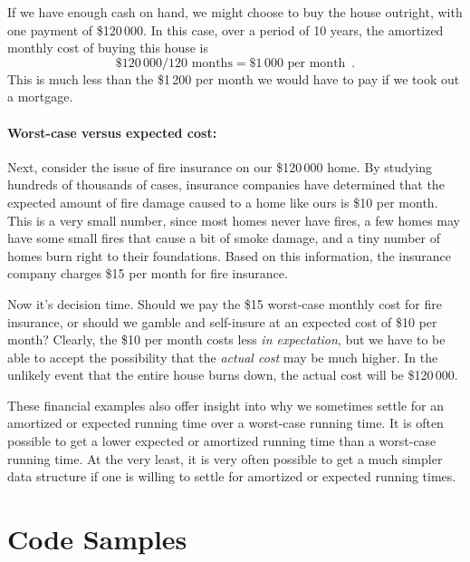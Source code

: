 If we have enough cash on hand, we might choose to buy the house outright,
with one payment of \$120\,000.  In this case, over a period of 10 years,
the amortized monthly cost of buying this house is
\[
   \$120\,000 / 120\text{ months} = \$1\,000\text{ per month} \enspace .
\]
This is much less than the \$1\,200 per month we would have to pay if
we took out a mortgage.

\paragraph{Worst-case versus expected cost:}
%
Next, consider the issue of fire insurance on our \$120\,000 home.
By studying hundreds of thousands of cases, insurance companies have
determined that the expected amount of fire damage caused to a home
like ours is \$10 per month.  This is a very small number, since most
homes never have fires, a few homes may have some small fires that
cause a bit of smoke damage, and a tiny number of homes burn right to
their foundations.  Based on this information, the insurance company
charges \$15 per month for fire insurance.

Now it's decision time. Should we pay the \$15 worst-case monthly cost
for fire insurance, or should we gamble and self-insure at an expected
cost of \$10 per month?  Clearly, the \$10 per month costs less \emph{in
expectation}, but we have to be able to accept the possibility that
the \emph{actual cost} may be much higher.  In the unlikely event that the
entire house burns down, the actual cost will be \$120\,000.

These financial examples also offer insight into why we sometimes settle
for an amortized or expected running time over a worst-case running time.
It is often possible to get a lower expected or amortized running time
than a worst-case running time. At the very least, it is very often possible
to get a much simpler data structure if one is willing to settle for
amortized or expected running times.

\section{Code Samples}

